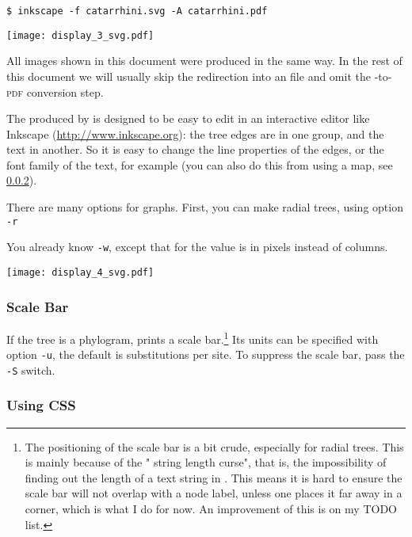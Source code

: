 \begin{verbatim}
$ inkscape -f catarrhini.svg -A catarrhini.pdf
\end{verbatim}

\begin{center}
 \texttt{[image: display\_3\_svg.pdf]}
\end{center}
All \svg{} images shown in this document were produced in the same way. In the
rest of this document we will usually skip the redirection into an \svg{} file
and omit the \svg{}-to-\textsc{pdf} conversion step.

The \svg{} produced by \display{} is designed to be easy to edit
in an interactive editor like Inkscape (\url{http://www.inkscape.org}): the
tree edges are in one group, and the text in another. So it is easy to change
the line properties of the edges, or the font family of the text, for example
(you can also do this from \display{} using a \css{} map, see
\ref{sct_display_svg_css}).

There are many options for \svg{} graphs. First, you can make radial trees,
using option \texttt{-r} 

You already know \texttt{-w}, except that for \svg{} the value is in pixels instead of columns. 

\begin{center}
\texttt{[image: display\_4\_svg.pdf]}
\end{center}

\subsubsection{Scale Bar}

If the tree is a phylogram, \display{} prints a scale bar.\footnote{The
positioning of the scale bar is a bit crude, especially for radial trees. This
is mainly because of the "\svg{} string length curse", that is, the
impossibility of finding out the length of a text string in \svg. This means it
is hard to ensure the scale bar will not overlap with a node label, unless one
places it far away in a corner, which is what I do for now. An improvement of
this is on my TODO list.} Its units can be specified with option \texttt{-u},
the default is substitutions per site. To suppress the scale bar, pass the
\texttt{-S} switch.

\subsubsection{Using CSS}
\label{sct_display_svg_css}


